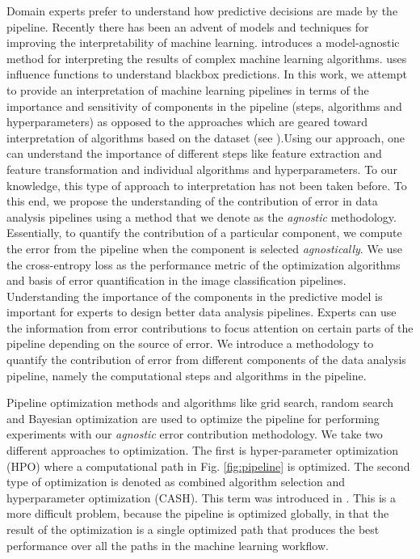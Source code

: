 Domain experts prefer to understand how predictive decisions are made by the pipeline. Recently there has been an advent of models and techniques for improving the interpretability of machine learning. \cite{ribeiro2016model} introduces a model-agnostic method for interpreting the results of complex machine learning algorithms. 
\cite{koh2017understanding} uses influence functions to understand blackbox predictions. In this work, we attempt to provide an interpretation of machine learning pipelines in terms of the importance and sensitivity of components in the pipeline (steps, algorithms and hyperparameters) as opposed to the approaches which are geared toward interpretation of algorithms based on the dataset (see \cite{koh2017understanding}).Using our approach, one can understand the importance of different steps like feature extraction and feature transformation and individual algorithms and hyperparameters. To our knowledge, this type of approach to interpretation has not been taken before.
To this end, we propose the understanding of the contribution of error in data analysis pipelines using a method that we denote as the \textit{agnostic} methodology. Essentially, to quantify the contribution of a particular component, we compute the error from the pipeline when the component is selected \textit{agnostically}. We use the cross-entropy loss as the performance metric of the optimization algorithms and basis of error quantification in the image classification pipelines. 
Understanding the importance of the components in the predictive model is important for experts to design better data analysis pipelines. 
Experts can use the information from error contributions to focus attention on certain parts of the pipeline depending on the source of error. 
We introduce a methodology to quantify the contribution of error from different components of the data analysis pipeline, namely the computational steps and algorithms in the pipeline. 

Pipeline optimization methods and algorithms like grid search, random search \cite{bergstra2012random} and Bayesian optimization \cite{snoek2012practical} are used to optimize the pipeline for performing experiments with our \textit{agnostic} error contribution methodology. We take two different approaches to optimization. The first is hyper-parameter optimization (HPO) where a computational path in Fig. \ref{fig:pipeline} is optimized. The second type of optimization is denoted as combined algorithm selection and hyperparameter optimization (CASH). This term was introduced in \cite{thornton2013auto}. This is a more difficult problem, because the pipeline is optimized globally, in that the result of the optimization is a single optimized path that produces the best performance over all the paths in the machine learning workflow.  

